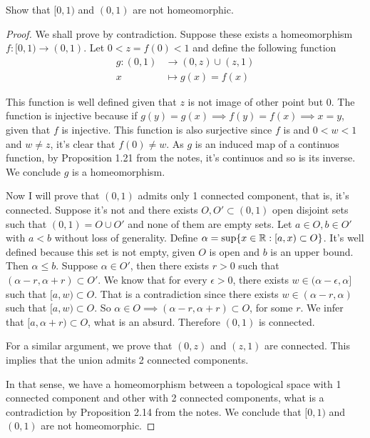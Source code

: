 \noindent\linia

\begin{exercise}
    Show that $[0, 1)$ and $(0, 1)$ are not homeomorphic.
\end{exercise}

\begin{proof}

We shall prove by contradiction. Suppose these exists a homeomorphism $f :
[0,1) \to (0,1)$. Let $0 < z = f(0) < 1$ and define the following function
\begin{align*}
    g : (0,1) &\to (0,z) \cup (z,1) \\
    x &\mapsto g(x) = f(x)
\end{align*}

This function is well defined given that $z$ is not image of other point but
$0$. The function is injective because if $g(y) = g(x) \implies f(y) = f(x)
\implies x = y$, given that $f$ is injective. This function is also surjective
since $f$ is and $0 < w < 1$ and $w \neq z$, it's clear that $f(0) \neq w$. As
$g$ is an induced map of a continuos function, by Proposition 1.21 from the
notes, it's continuos and so is its inverse. We conclude $g$ is a
homeomorphism. 

Now I will prove that $(0,1)$ admits only 1 connected component, that is, it's
connected. Suppose it's not and there exists $O, O' \subset (0,1)$ open
disjoint sets such that $(0,1) = O \cup O'$ and none of them are
empty sets. Let $a \in O, b \in O'$ with $a < b$ without loss of generality.
Define $\alpha = \sup\{x \in \mathbb{R} : [a,x) \subset O\}$. It's well
defined because this set is not empty, given $O$ is open and $b$ is an upper
bound. Then $\alpha \leq b$. Suppose $\alpha \in O'$, then there exists $r >
0$ such that $(\alpha - r,\alpha + r) \subset O'$. We know that for every
$\epsilon > 0$, there exists $w \in (\alpha - \epsilon, \alpha]$ such that
$[a, w) \subset O$. That is a contradiction since there exists $w \in (\alpha
- r, \alpha)$ such that $[a, w) \subset O$. So $\alpha \in O \implies (\alpha
- r, \alpha + r) \subset O$, for some $r$. We infer that $[a,\alpha + r) \subset
O$, what is an absurd. Therefore $(0,1)$ is connected. 

For a similar argument, we prove that $(0,z)$ and $(z,1)$ are connected. This
implies that the union admits 2 connected components.

In that sense, we have a homeomorphism between a topological space with 1
connected component and other with 2 connected components, what is a
contradiction by Proposition 2.14 from the notes. We conclude that $[0,1)$ and
$(0,1)$ are not homeomorphic.

\end{proof}